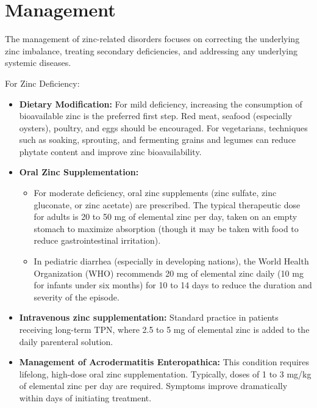 \section*{Management}
The management of zinc-related disorders focuses on correcting the underlying zinc imbalance, treating secondary deficiencies, and addressing any underlying systemic diseases.

For Zinc Deficiency:
\begin{itemize}
    \item \textbf{Dietary Modification:} For mild deficiency, increasing the consumption of bioavailable zinc is the preferred first step. Red meat, seafood (especially oysters), poultry, and eggs should be encouraged. For vegetarians, techniques such as soaking, sprouting, and fermenting grains and legumes can reduce phytate content and improve zinc bioavailability.
    \item \textbf{Oral Zinc Supplementation:}
    \begin{itemize}
        \item For moderate deficiency, oral zinc supplements (zinc sulfate, zinc gluconate, or zinc acetate) are prescribed. The typical therapeutic dose for adults is 20 to 50 mg of elemental zinc per day, taken on an empty stomach to maximize absorption (though it may be taken with food to reduce gastrointestinal irritation).
        \item In pediatric diarrhea (especially in developing nations), the World Health Organization (WHO) recommends 20 mg of elemental zinc daily (10 mg for infants under six months) for 10 to 14 days to reduce the duration and severity of the episode.
    \end{itemize}
    \item \textbf{Intravenous zinc supplementation:} Standard practice in patients receiving long-term TPN, where 2.5 to 5 mg of elemental zinc is added to the daily parenteral solution.
    \item \textbf{Management of Acrodermatitis Enteropathica:} This condition requires lifelong, high-dose oral zinc supplementation. Typically, doses of 1 to 3 mg/kg of elemental zinc per day are required. Symptoms improve dramatically within days of initiating treatment.
\end{itemize}


